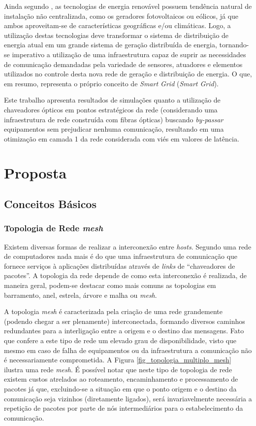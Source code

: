 \documentclass[conference]{IEEEtran}
\begin{document}
Ainda segundo \cite{Art-Gungor2013}, as tecnologias de energia renovável possuem tendência natural de instalação não centralizada, como os geradores fotovoltaicos ou eólicos, já que ambos aproveitam-se de características geográficas e/ou climáticas. Logo, a utilização destas tecnologias deve transformar o sistema de distribuição de energia atual em um grande sistema de geração distribuída de energia, tornando-se imperativo a utilização de uma infraestrutura capaz de suprir as necessidades de comunicação demandadas pela variedade de sensores, atuadores e elementos utilizados no controle desta nova rede de geração e distribuição de energia. O que, em resumo, representa o próprio conceito de \emph{Smart Grid} (\emph{Smart Grid}).

Este trabalho apresenta resultados de simulações quanto a utilização de chaveadores ópticos em pontos estratégicos da rede (considerando uma infraestrutura de rede construída com fibras ópticas) buscando \emph{by-passar} equipamentos sem prejudicar nenhuma comunicação, resultando em uma otimização em camada 1 da rede considerada com viés em valores de latência.

\section{Proposta}

\subsection{Conceitos Básicos}

\subsubsection{Topologia de Rede \emph{mesh}}
Existem diversas formas de realizar a interconexão entre \emph{hosts}. Segundo \cite{Book-Kurose2013} uma rede de computadores nada mais é do que uma infraestrutura de comunicação que fornece serviços à aplicações distribuídas através de \emph{links} de ``chaveadores de pacotes''. A topologia da rede depende de como esta interconexão é realizada, de maneira geral, podem-se destacar como mais comuns as topologias em barramento, anel, estrela, árvore e malha ou \emph{mesh}.

A topologia \emph{mesh} é caracterizada pela criação de uma rede grandemente (podendo chegar a ser plenamente) interconectada, formando diversos caminhos redundantes para a interligação entre a origem e o destino das mensagens. Fato que confere a este tipo de rede um elevado grau de disponibilidade, visto que mesmo em caso de falha de equipamentos ou da infraestrutura a comunicação não é necessariamente comprometida. A Figura \ref{fig_topologia_multiplo_mesh} ilustra uma rede \emph{mesh}. É possível notar que neste tipo de topologia de rede existem custos atrelados ao roteamento, encaminhamento e processamento de pacotes já que, excluindo-se a situação em que o ponto origem e o destino da comunicação seja vizinhos (diretamente ligados), será invariavelmente necessária a repetição de pacotes por parte de nós intermediários para o estabelecimento da comunicação.
\end{document}
